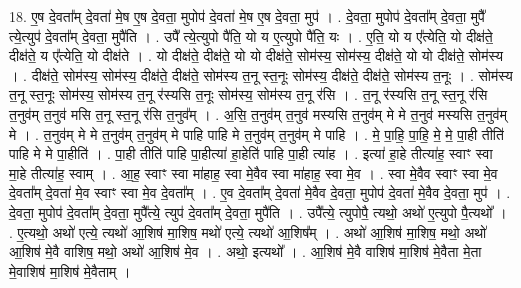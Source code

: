 \documentclass[17pt]{extarticle}
\begin{document}
18. ए॒ष दे॒वता᳚म् दे॒वता॑ मे॒ष ए॒ष दे॒वता॒ मुपोप॑ दे॒वता॑ मे॒ष ए॒ष दे॒वता॒ मुप॑ । . दे॒वता॒ मुपोप॑ दे॒वता᳚म् दे॒वता॒ मुपै᳚ त्ये॒त्युप॑ दे॒वता᳚म् दे॒वता॒ मुपै॑ति । . उपै᳚ त्ये॒त्युपो पै॑ति॒ यो य ए॒त्युपो पै॑ति॒ यः । . ए॒ति॒ यो य ए᳚त्येति॒ यो दीक्ष॑ते॒ दीक्ष॑ते॒ य ए᳚त्येति॒ यो दीक्ष॑ते । . यो दीक्ष॑ते॒ दीक्ष॑ते॒ यो यो दीक्ष॑ते॒ सोम॑स्य॒ सोम॑स्य॒ दीक्ष॑ते॒ यो यो दीक्ष॑ते॒ सोम॑स्य । . दीक्ष॑ते॒ सोम॑स्य॒ सोम॑स्य॒ दीक्ष॑ते॒ दीक्ष॑ते॒ सोम॑स्य त॒नू स्त॒नूः सोम॑स्य॒ दीक्ष॑ते॒ दीक्ष॑ते॒ सोम॑स्य त॒नूः । . सोम॑स्य त॒नू स्त॒नूः सोम॑स्य॒ सोम॑स्य त॒नू र॑स्यसि त॒नूः सोम॑स्य॒ सोम॑स्य त॒नू र॑सि । . त॒नू र॑स्यसि त॒नू स्त॒नू र॑सि त॒नुव॑म् त॒नुव॑ मसि त॒नू स्त॒नू र॑सि त॒नुव᳚म् । . अ॒सि॒ त॒नुव॑म् त॒नुव॑ मस्यसि त॒नुव॑म् मे मे त॒नुव॑ मस्यसि त॒नुव॑म् मे । . त॒नुव॑म् मे मे त॒नुव॑म् त॒नुव॑म् मे पाहि पाहि मे त॒नुव॑म् त॒नुव॑म् मे पाहि । . मे॒ पा॒हि॒ पा॒हि॒ मे॒ मे॒ पा॒ही तीति॑ पाहि मे मे पा॒हीति॑ । . पा॒ही तीति॑ पाहि पा॒हीत्या॑ हा॒हेति॑ पाहि पा॒ही त्या॑ह । . इत्या॑ हा॒हे तीत्या॑ह॒ स्वाꣳ स्वा मा॒हे तीत्या॑ह॒ स्वाम् । . आ॒ह॒ स्वाꣳ स्वा मा॑हाह॒ स्वा मे॒वैव स्वा मा॑हाह॒ स्वा मे॒व । . स्वा मे॒वैव स्वाꣳ स्वा मे॒व दे॒वता᳚म् दे॒वता॑ मे॒व स्वाꣳ स्वा मे॒व दे॒वता᳚म् । . ए॒व दे॒वता᳚म् दे॒वता॑ मे॒वैव दे॒वता॒ मुपोप॑ दे॒वता॑ मे॒वैव दे॒वता॒ मुप॑ । . दे॒वता॒ मुपोप॑ दे॒वता᳚म् दे॒वता॒ मुपै᳚त्ये॒ त्युप॑ दे॒वता᳚म् दे॒वता॒ मुपै॑ति । . उपै᳚त्ये॒ त्युपोपै॒ त्यथो॒ अथो॑ ए॒त्युपो पै॒त्यथो᳚ । . ए॒त्यथो॒ अथो॑ एत्ये॒ त्यथो॑ आ॒शिष॑ मा॒शिष॒ मथो॑ एत्ये॒ त्यथो॑ आ॒शिष᳚म् । . अथो॑ आ॒शिष॑ मा॒शिष॒ मथो॒ अथो॑ आ॒शिष॑ मे॒वै वाशिष॒ मथो॒ अथो॑ आ॒शिष॑ मे॒व । . अथो॒ इत्यथो᳚ । . आ॒शिष॑ मे॒वै वाशिष॑ मा॒शिष॑ मे॒वैता मे॒ता मे॒वाशिष॑ मा॒शिष॑ मे॒वैताम् । \newline
\end{document}
